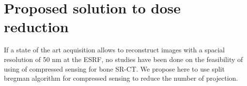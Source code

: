 \section{Proposed solution to dose reduction}
	If a state of the art acquisition allows to reconstruct images with a spacial resolution of 50 nm at the ESRF, no studies have been done on the feasibility of using of compressed sensing for bone SR-CT. We propose here to use split bregman algorithm for compressed sensing to reduce the number of projection.
